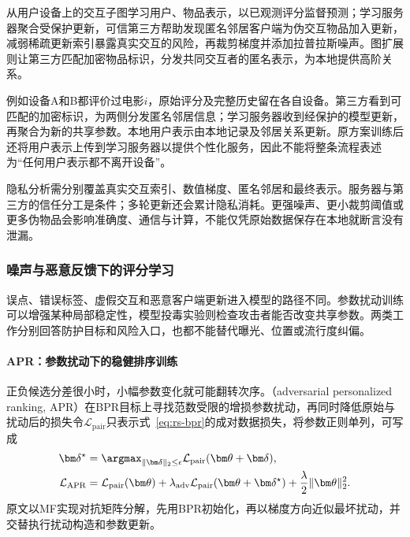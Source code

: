 从用户设备上的交互子图学习用户、物品表示，以已观测评分监督预测；学习服务器聚合受保护更新，可信第三方帮助发现匿名邻居客户端为伪交互物品加入更新，减弱稀疏更新索引暴露真实交互的风险，再裁剪梯度并添加拉普拉斯噪声。图扩展则让第三方匹配加密物品标识，分发共同交互者的匿名表示，为本地提供高阶关系。

例如设备A和B都评价过电影$i$，原始评分及完整历史留在各自设备。第三方看到可匹配的加密标识，为两侧分发匿名邻居信息；学习服务器收到经保护的模型更新，再聚合为新的共享参数。本地用户表示由本地记录及邻居关系更新。原方案训练后还将用户表示上传到学习服务器以提供个性化服务，因此不能将整条流程表述为“任何用户表示都不离开设备”。

隐私分析需分别覆盖真实交互索引、数值梯度、匿名邻居和最终表示。服务器与第三方的信任分工是条件；多轮更新还会累计隐私消耗。更强噪声、更小裁剪阈值或更多伪物品会影响准确度、通信与计算，不能仅凭原始数据保存在本地就断言没有泄漏。

\subsubsection{噪声与恶意反馈下的评分学习}
\label{sec:rs-robust-scoring}

误点、错误标签、虚假交互和恶意客户端更新进入模型的路径不同。参数扰动训练可以增强某种局部稳定性，模型投毒实验则检查攻击者能否改变共享参数。两类工作分别回答防护目标和风险入口，也都不能替代曝光、位置或流行度纠偏。

\paragraph{APR：参数扰动下的稳健排序训练}
\label{sec:rs-apr}

正负候选分差很小时，小幅参数变化就可能翻转次序。（adversarial personalized ranking, APR）在BPR目标上寻找范数受限的增损参数扰动，再同时降低原始与扰动后的损失令$\mathcal L_{\mathrm{pair}}$只表示式~\eqref{eq:rs-bpr}的成对数据损失，将参数正则单列，可写成
\begin{align}
 \bm\delta^\star&=\argmax_{\lVert\bm\delta\rVert_2\leq\epsilon}
       \mathcal L_{\mathrm{pair}}(\bm\theta+\bm\delta),\\
 \mathcal L_{\mathrm{APR}}
   &=\mathcal L_{\mathrm{pair}}(\bm\theta)
     +\lambda_{\mathrm{adv}}
       \mathcal L_{\mathrm{pair}}(\bm\theta+\bm\delta^\star)
       +\frac{\lambda}{2}\lVert\bm\theta\rVert_2^2.
 \label{eq:rs-apr}
\end{align}
原文以MF实现对抗矩阵分解，先用BPR初始化，再以梯度方向近似最坏扰动，并交替执行扰动构造和参数更新。

